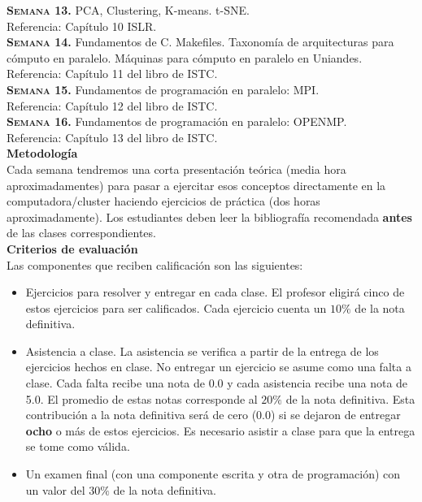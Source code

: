 \documentclass[letterpaper,10pt,onecolumn]{article}
\begin{document}
\noindent\textbf{\textsc{Semana 13.}} 
PCA, Clustering, K-means. t-SNE.\\
Referencia: Cap\'itulo 10 ISLR. 
\\[-0.3cm] 

\noindent\textbf{\textsc{Semana 14.}}
Fundamentos de C. Makefiles. Taxonom\'ia de arquitecturas para
c\'omputo en paralelo. M\'aquinas para c\'omputo en paralelo en
Uniandes.\\ 
Referencia: Cap\'itulo 11 del libro de ISTC. 
\\[-0.3cm]

\noindent\textbf{\textsc{Semana 15.}} 
Fundamentos de programaci\'on en paralelo: MPI.\\
Referencia: Cap\'itulo 12 del libro de ISTC.
\\[-0.3cm]  


\noindent\textbf{\textsc{Semana 16.}} 
Fundamentos de programaci\'on en paralelo: OPENMP.\\
Referencia: Cap\'itulo 13 del libro de ISTC.
\\[0.1cm]


\noindent\textbf{\large {} \quad
  Metodolog\'ia}\\[-0.2cm] 


\noindent\normalsize Cada semana tendremos una corta presentaci\'on
te\'orica (media hora aproximadamentes) para pasar a ejercitar esos
conceptos directamente en la computadora/cluster haciendo
ejercicios de pr\'actica (dos horas aproximadamente). 
Los estudiantes deben leer la bibliograf\'ia recomendada {\bf antes}
de las clases correspondientes.
\\[0.1cm]


\noindent\textbf{\large {} \quad Criterios de
  evaluaci\'on}\\[-0.2cm] 

Las componentes que reciben calificaci\'on son las siguientes:

\begin{itemize}
\item 
Ejercicios para resolver y entregar en cada clase. 
El profesor eligir\'a cinco de estos ejercicios para ser calificados. 
Cada ejercicio cuenta un $10\%$ de la nota definitiva.

\item
Asistencia a clase. La asistencia se verifica a partir de la entrega de
los ejercicios hechos en clase. 
No entregar un ejercicio se asume como una falta a clase.
Cada falta recibe una nota de 0.0 y cada
asistencia recibe una nota de 5.0. 
El promedio de estas notas corresponde al $20\%$ de la nota
definitiva. 
Esta contribuci\'on a la nota definitiva ser\'a de cero (0.0) si se
dejaron de entregar {\bf ocho} o m\'as de estos ejercicios.
Es necesario asistir a clase para que la entrega se tome como
v\'alida. 
\item
Un examen final (con una componente escrita y otra de
programaci\'on) con un valor del $30\%$ de la nota definitiva.
\end{itemize}
\end{document}
